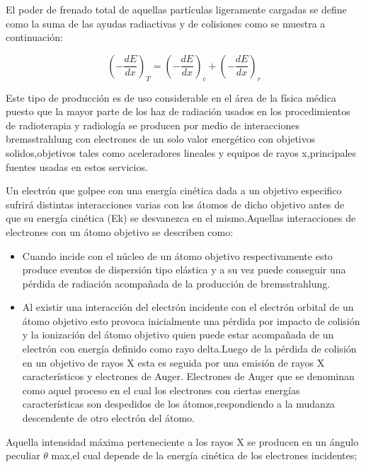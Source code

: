 \documentclass[12pt,fleqn]{book} %
\numberwithin{equation}{section} %
\numberwithin{figure}{section} %
\numberwithin{table}{section} %
\begin{document}
 
El poder de frenado total de aquellas partículas ligeramente cargadas se define como la suma de las ayudas radiactivas y de colisiones como se muestra a continuación:

\begin{equation}
 \left (-  \frac{dE}{dx}\right )_{T}=\left (-  \frac{dE}{dx}\right )_{c}+\left (-  \frac{dE}{dx}\right )_{r}
\end{equation}

Este tipo de producción es de uso considerable en el área de la física médica puesto que la mayor parte de los haz de radiación usados en los procedimientos de radioterapia y radiología se producen por medio de interacciones bremsstrahlung con electrones de un solo valor energético con objetivos solidos,objetivos tales como aceleradores lineales y equipos de rayos x,principales fuentes usadas en estos servicios.

 
Un electrón que golpee con una energía cinética dada a un objetivo especifico sufrirá  distintas interacciones varias con los átomos de dicho objetivo antes de que su energía cinética (Ek) se desvanezca en el mismo.Aquellas interacciones de electrones con un átomo objetivo se describen como:

\begin{itemize}
 \item Cuando incide con el núcleo de un átomo objetivo respectivamente esto produce eventos de dispersión tipo elástica y a su vez puede conseguir una pérdida de radiación acompañada de la producción de bremsstrahlung.
 \item Al existir una interacción del electrón incidente con el electrón orbital de un átomo objetivo esto provoca inicialmente una pérdida por impacto de colisión y la ionización del átomo objetivo quien puede estar  acompañada de un electrón con energía definido como rayo delta.Luego de la pérdida de colisión en un objetivo de rayos X esta es seguida por una  emisión de rayos X característicos y electrones de Auger.
 Electrones de Auger que se denominan como aquel proceso en el cual los electrones con ciertas energías características son despedidos de los átomos,respondiendo a la mudanza descendente de otro electrón del átomo.
 \end{itemize}

 Aquella intensidad máxima perteneciente a los rayos X se producen en un ángulo peculiar $\theta$ max,el cual depende de la energía cinética de los electrones incidentes;
\end{document}
